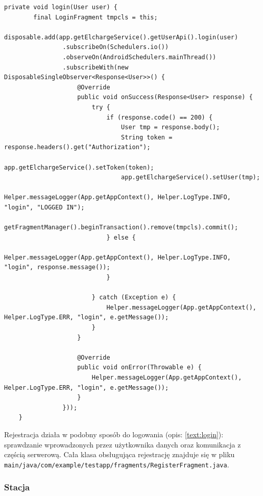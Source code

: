 \begin{lstlisting}[label=list:android_login_async,caption=Logowanie: wysłanie zapytania i obsługa odpowiedzi,basicstyle=\tiny\ttfamily]
    private void login(User user) {
        final LoginFragment tmpcls = this;
        disposable.add(app.getElchargeService().getUserApi().login(user)
                .subscribeOn(Schedulers.io())
                .observeOn(AndroidSchedulers.mainThread())
                .subscribeWith(new DisposableSingleObserver<Response<User>>() {
                    @Override
                    public void onSuccess(Response<User> response) {
                        try {
                            if (response.code() == 200) {
                                User tmp = response.body();
                                String token = response.headers().get("Authorization");
                                app.getElchargeService().setToken(token);
                                app.getElchargeService().setUser(tmp);
                                Helper.messageLogger(App.getAppContext(), Helper.LogType.INFO, "login", "LOGGED IN");
                                getFragmentManager().beginTransaction().remove(tmpcls).commit();
                            } else {
                                Helper.messageLogger(App.getAppContext(), Helper.LogType.INFO, "login", response.message());
                            }

                        } catch (Exception e) {
                            Helper.messageLogger(App.getAppContext(), Helper.LogType.ERR, "login", e.getMessage());
                        }
                    }

                    @Override
                    public void onError(Throwable e) {
                        Helper.messageLogger(App.getAppContext(), Helper.LogType.ERR, "login", e.getMessage());
                    }
                }));
    }
\end{lstlisting}

Rejestracja działa w podobny sposób do logowania (opis: \ref{text:login}): sprawdzanie wprowadzonych przez użytkownika danych oraz komunikacja z częścią serwerową. Cała klasa obsługująca rejestrację znajduje się w pliku \texttt{main/java/com/example/testapp/fragments/RegisterFragment.java}.

\subsubsection{Stacja}
